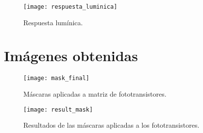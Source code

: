             \begin{figure}[hbtp]
                \centering
                \texttt{[image: respuesta\_luminica]}
                \caption{Respuesta lumínica.}
                \label{fig:respuesta_luminica}
            \end{figure}            
            
            

\section{Imágenes obtenidas}

            \begin{figure}[hbtp]
                \centering
                \texttt{[image: mask\_final]}
                \caption{Máscaras aplicadas a matriz de fototransistores.}
                \label{fig:mask_final}
            \end{figure}  

            \begin{figure}[hbtp]
                \centering
                \texttt{[image: result\_mask]}
                \caption{Resultados de las máscaras aplicadas a los fototransistores.}
                \label{fig:result_mask}
            \end{figure}
